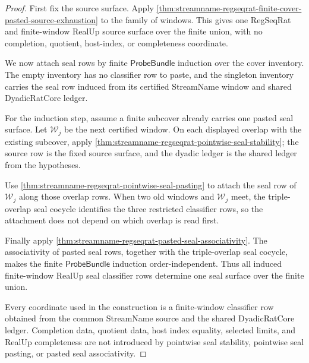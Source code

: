 \begin{proof}
First fix the source surface. Apply
\autoref{thm:streamname-regseqrat-finite-cover-pasted-source-exhaustion} to
the family of windows. This gives one RegSeqRat and finite-window RealUp
source surface over the finite union, with no completion, quotient,
host-index, or completeness coordinate.

We now attach seal rows by finite $\mathsf{ProbeBundle}$ induction over the
cover inventory. The empty inventory has no classifier row to paste, and the
singleton inventory carries the seal row induced from its certified StreamName
window and shared DyadicRatCore ledger.

For the induction step, assume a finite subcover already carries one pasted
seal surface. Let $\mathcal{W}_j$ be the next certified window. On each
displayed overlap with the existing subcover, apply
\autoref{thm:streamname-regseqrat-pointwise-seal-stability}; the source row is
the fixed source surface, and the dyadic ledger is the shared ledger from the
hypotheses.

Use \autoref{thm:streamname-regseqrat-pointwise-seal-pasting} to attach the
seal row of $\mathcal{W}_j$ along those overlap rows. When two old windows and
$\mathcal{W}_j$ meet, the triple-overlap seal cocycle identifies the three
restricted classifier rows, so the attachment does not depend on which overlap
is read first.

Finally apply
\autoref{thm:streamname-regseqrat-pasted-seal-associativity}. The associativity
of pasted seal rows, together with the triple-overlap seal cocycle, makes the
finite $\mathsf{ProbeBundle}$ induction order-independent. Thus all induced
finite-window RealUp seal classifier rows determine one seal surface over the
finite union.

Every coordinate used in the construction is a finite-window classifier row
obtained from the common StreamName source and the shared DyadicRatCore
ledger. Completion data, quotient data, host index equality, selected limits,
and RealUp completeness are not introduced by pointwise seal stability,
pointwise seal pasting, or pasted seal associativity.
\end{proof}

